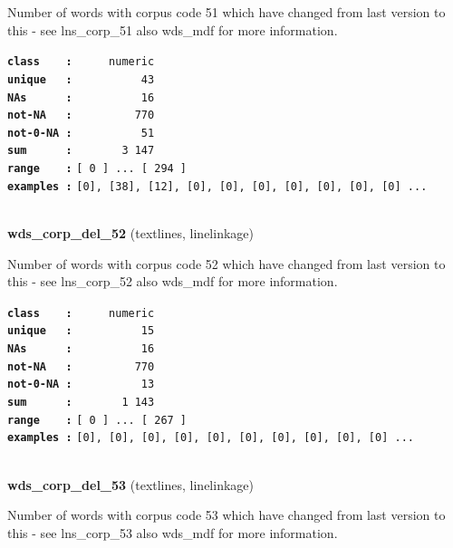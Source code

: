 \documentclass[]{article}
\begin{document}
Number of words with corpus code 51 which have changed from last version
to this - see lns\_corp\_51 also wds\_mdf for more information.

\textbf{\texttt{class\ \ \ \ :}} \texttt{~~~~~numeric}\\
\textbf{\texttt{unique\ \ \ :}} \texttt{~~~~~~~~~~43}\\
\textbf{\texttt{NAs\ \ \ \ \ \ :}} \texttt{~~~~~~~~~~16}\\
\textbf{\texttt{not-NA\ \ \ :}} \texttt{~~~~~~~~~770}\\
\textbf{\texttt{not-0-NA\ :}} \texttt{~~~~~~~~~~51}\\
\textbf{\texttt{sum\ \ \ \ \ \ :}} \texttt{~~~~~~~3~147}\\
\textbf{\texttt{range\ \ \ \ :}}
\texttt{{[}\ 0\ {]}\ ...\ {[}\ 294\ {]}}\\
\textbf{\texttt{examples\ :}}
\texttt{{[}0{]},\ {[}38{]},\ {[}12{]},\ {[}0{]},\ {[}0{]},\ {[}0{]},\ {[}0{]},\ {[}0{]},\ {[}0{]},\ {[}0{]}\ ...}\\

~

\textbf{wds\_corp\_del\_52} (textlines, linelinkage)

Number of words with corpus code 52 which have changed from last version
to this - see lns\_corp\_52 also wds\_mdf for more information.

\textbf{\texttt{class\ \ \ \ :}} \texttt{~~~~~numeric}\\
\textbf{\texttt{unique\ \ \ :}} \texttt{~~~~~~~~~~15}\\
\textbf{\texttt{NAs\ \ \ \ \ \ :}} \texttt{~~~~~~~~~~16}\\
\textbf{\texttt{not-NA\ \ \ :}} \texttt{~~~~~~~~~770}\\
\textbf{\texttt{not-0-NA\ :}} \texttt{~~~~~~~~~~13}\\
\textbf{\texttt{sum\ \ \ \ \ \ :}} \texttt{~~~~~~~1~143}\\
\textbf{\texttt{range\ \ \ \ :}}
\texttt{{[}\ 0\ {]}\ ...\ {[}\ 267\ {]}}\\
\textbf{\texttt{examples\ :}}
\texttt{{[}0{]},\ {[}0{]},\ {[}0{]},\ {[}0{]},\ {[}0{]},\ {[}0{]},\ {[}0{]},\ {[}0{]},\ {[}0{]},\ {[}0{]}\ ...}\\

~

\textbf{wds\_corp\_del\_53} (textlines, linelinkage)

Number of words with corpus code 53 which have changed from last version
to this - see lns\_corp\_53 also wds\_mdf for more information.
\end{document}
